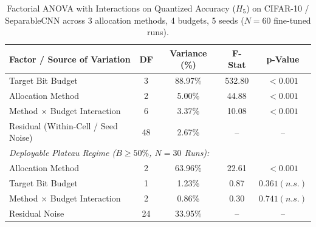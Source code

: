 \begin{table}[!t]
\centering
\caption{Factorial ANOVA with Interactions on Quantized Accuracy ($H_5$) on CIFAR-10 / SeparableCNN across 3 allocation methods, 4 budgets, 5 seeds ($N=60$ fine-tuned runs).}
\label{tab:variance_decomposition}
\scriptsize
\setlength{\tabcolsep}{3.0pt}
\begin{tabular}{lcccc}
\toprule
\textbf{Factor / Source of Variation} & \textbf{DF} & \textbf{Variance (\%)} & \textbf{F-Stat} & \textbf{p-Value} \\
\midrule
Target Bit Budget & 3 & 88.97\% & 532.80 & $<0.001$ \\
Allocation Method & 2 & 5.00\% & 44.88 & $<0.001$ \\
Method $\times$ Budget Interaction & 6 & 3.37\% & 10.08 & $<0.001$ \\
Residual (Within-Cell / Seed Noise) & 48 & 2.67\% & -- & -- \\
\midrule
\multicolumn{5}{l}{\textit{Deployable Plateau Regime ($B \ge 50\%$, $N=30$ Runs):}} \\
Allocation Method & 2 & 63.96\% & 22.61 & $<0.001$ \\
Target Bit Budget & 1 & 1.23\% & 0.87 & $0.361 (n.s.)$ \\
Method $\times$ Budget Interaction & 2 & 0.86\% & 0.30 & $0.741 (n.s.)$ \\
Residual Noise & 24 & 33.95\% & -- & -- \\
\bottomrule
\end{tabular}
\end{table}
